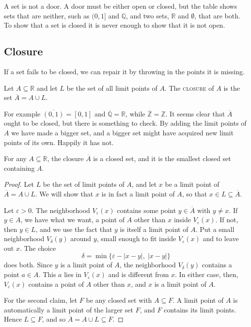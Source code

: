 \begin{dangerousbend}
A set is not a door.  A door must be either open or closed, but the table shows sets that are neither, such as $(0,1]$ and $\mathbb{Q}$, and two sets, $\mathbb{R}$ and $\emptyset$, that are both.  To show that a set is closed it is never enough to show that it is not open.
\end{dangerousbend}

\subsection{Closure}

If a set fails to be closed, we can repair it by throwing in the points it is missing.

\begin{definition}
Let $A \subseteq \mathbb{R}$ and let $L$ be the set of all limit points of $A$.  The \textsc{closure} of $A$ is the set $\overline{A} = A \cup L$.
\end{definition}

For example $\overline{(0,1)} = [0,1]$ and $\overline{\mathbb{Q}} = \mathbb{R}$, while $\overline{\mathbb{Z}} = \mathbb{Z}$.  It seems clear that $\overline{A}$ ought to be closed, but there is something to check.  By adding the limit points of $A$ we have made a bigger set, and a bigger set might have acquired new limit points of its own.  Happily it has not.

\begin{theorem}\label{thm:closure}
For any $A \subseteq \mathbb{R}$, the closure $\overline{A}$ is a closed set, and it is the smallest closed set containing $A$.
\end{theorem}

\begin{proof}
Let $L$ be the set of limit points of $A$, and let $x$ be a limit point of $\overline{A} = A \cup L$.  We will show that $x$ is in fact a limit point of $A$, so that $x \in L \subseteq \overline{A}$.

Let $\varepsilon > 0$.  The neighborhood $V_{\varepsilon}(x)$ contains some point $y \in \overline{A}$ with $y \neq x$.  If $y \in A$, we have what we want, a point of $A$ other than $x$ inside $V_{\varepsilon}(x)$.  If not, then $y \in L$, and we use the fact that $y$ is itself a limit point of $A$.  Put a small neighborhood $V_{\delta}(y)$ around $y$, small enough to fit inside $V_{\varepsilon}(x)$ and to leave out $x$.  The choice
\[ \delta = \min\{\varepsilon - |x - y|,\; |x - y|\} \]
does both.  Since $y$ is a limit point of $A$, the neighborhood $V_{\delta}(y)$ contains a point $a \in A$.  This $a$ lies in $V_{\varepsilon}(x)$ and is different from $x$.  In either case, then, $V_{\varepsilon}(x)$ contains a point of $A$ other than $x$, and $x$ is a limit point of $A$.

For the second claim, let $F$ be any closed set with $A \subseteq F$.  A limit point of $A$ is automatically a limit point of the larger set $F$, and $F$ contains its limit points.  Hence $L \subseteq F$, and so $\overline{A} = A \cup L \subseteq F$.
\end{proof}

